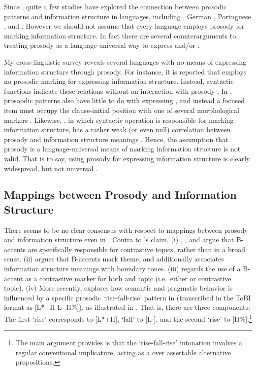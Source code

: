 Since \citet{jackendoff:72}, quite a few studies have explored the
connection between prosodic patterns and information structure in
languages, including  \citep{steedman:00}, German
\citep{buring:03}, Portuguese \citep{frota:00},  and
 \citep{ueyama:jun:98}.  However we should not assume that
every language employs prosody for marking information structure.  In
fact there are several counterarguments to treating prosody as a
language-universal way to express  and/or .



My cross-linguistic survey reveals several languages with no means of
expressing information structure through prosody.  For instance, it is
reported that  employs no prosodic marking for
expressing information structure.  Instead, syntactic functions
indicate these relations without an interaction with prosody
\citep{kugler:etal:07}.  In , prosoodic patterns also have
little to do with expressing , and instead a focused item must
occupy the clause-initial position with one of several morphological
markers \citep{drubig:03}. Likewise, ,
in which syntactic operation is responsible for marking information
structure, has a rather weak (or even null) correlation between
prosody and information structure meanings
\citep{engdahl:vallduvi:96}. Hence, the assumption that
prosody is a language-universal means of marking information structure
is not valid.  That is to say, using prosody for expressing
information structure is clearly widespread, but not universal
\citep{drellishak:09}.


\subsection{Mappings between Prosody and Information Structure}
\label{4:ssec:conditions}


There seems to be no clear consensus with respect to mappings between
prosody and information structure even in . Contra to
\citeauthor{jackendoff:72}'s claim, (i) \citet{kadmon:01},
\citet{buring:03}, and \citet{oshima:08} argue that B-accents are
specifically responsible for contrastive topics,
rather than  in a broad sense.
(ii) \citet{steedman:00} argues that B-accents mark
theme, and additionally associates information structure meanings with
boundary tones.  (iii) \citet{hedberg:06} regards the use of a
B-accent as a contrastive marker for both  and topic
(i.e.\ either  or contrastive topic). (iv) More
recently, \citet{constant:12} explores how semantic and pragmatic
behavior is influenced by a specific prosodic `rise-fall-rise' pattern
in  (transcribed in the ToBI format as [L*+H L- H\%]), as
illustrated in . That is, there are three
components: The first `rise' corresponds to [L*+H], `fall' to [L-],
and the second `rise' to [H\%].\footnote{The main argument
  \citet{constant:12} provides is that the `rise-fall-rise' intonation
  involves a regular conventional implicature, acting as a   over assertable alternative
  propositions.}

